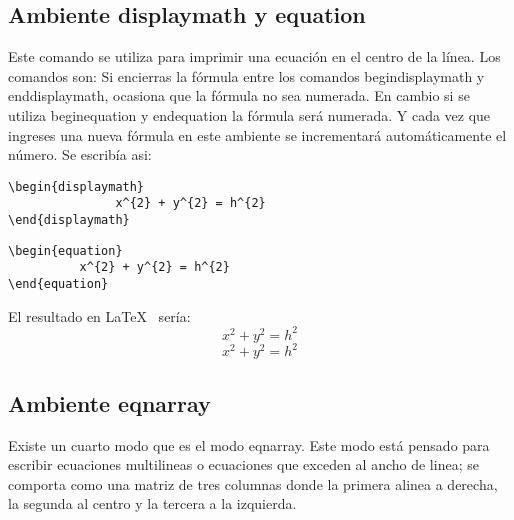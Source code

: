 \documentclass[a4paper,12pt]{article}
\begin{document}
\subsection{Ambiente displaymath y equation}
Este comando se utiliza para imprimir una ecuación en el centro de la línea. Los comandos son:
Si encierras la fórmula entre los comandos begin{displaymath} y end{displaymath}, 
ocasiona que la fórmula no sea numerada.
En cambio si se utiliza begin{equation} y end{equation} la fórmula será numerada. Y cada 
vez que ingreses una nueva fórmula en este ambiente se incrementará automáticamente el número.
Se escribía asi:
\begin{verbatim}
\begin{displaymath}
               x^{2} + y^{2} = h^{2}
\end{displaymath}
\end{verbatim}
\begin{verbatim}
\begin{equation}
	      x^{2} + y^{2} = h^{2}
\end{equation} 
\end{verbatim}
El resultado en \LaTeX{}~\cite{Lam:86} sería:
\begin{displaymath}
               x^{2} + y^{2} = h^{2}
\end{displaymath}
\begin{equation}
	      x^{2} + y^{2} = h^{2}
\end{equation} 

\subsection{Ambiente eqnarray}
Existe un cuarto modo que es el modo eqnarray. Este modo está pensado para escribir ecuaciones 
multilineas o ecuaciones que exceden al ancho de linea; se comporta como una matriz de tres columnas 
donde la primera alinea a derecha, la segunda al centro y la tercera a la izquierda.
\end{document}
